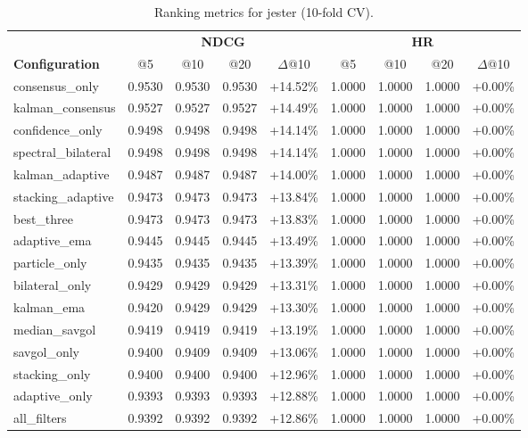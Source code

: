 \begin{table}[htbp]
\centering
\caption{Ranking metrics for jester (10-fold CV).}
\label{tab:ranking-jester}
\begin{adjustbox}{max width=\textwidth}
\begin{tabular}{l cccc cccc}
\toprule
& \multicolumn{4}{c}{\textbf{NDCG}} & \multicolumn{4}{c}{\textbf{HR}} \\
\cmidrule(lr){2-5} \cmidrule(lr){6-9}
\textbf{Configuration} & @5 & @10 & @20 & $\Delta$@10 & @5 & @10 & @20 & $\Delta$@10 \\
\midrule
consensus\_only & 0.9530 & 0.9530 & 0.9530 & +14.52\% & 1.0000 & 1.0000 & 1.0000 & +0.00\% \\
kalman\_consensus & 0.9527 & 0.9527 & 0.9527 & +14.49\% & 1.0000 & 1.0000 & 1.0000 & +0.00\% \\
confidence\_only & 0.9498 & 0.9498 & 0.9498 & +14.14\% & 1.0000 & 1.0000 & 1.0000 & +0.00\% \\
spectral\_bilateral & 0.9498 & 0.9498 & 0.9498 & +14.14\% & 1.0000 & 1.0000 & 1.0000 & +0.00\% \\
kalman\_adaptive & 0.9487 & 0.9487 & 0.9487 & +14.00\% & 1.0000 & 1.0000 & 1.0000 & +0.00\% \\
stacking\_adaptive & 0.9473 & 0.9473 & 0.9473 & +13.84\% & 1.0000 & 1.0000 & 1.0000 & +0.00\% \\
best\_three & 0.9473 & 0.9473 & 0.9473 & +13.83\% & 1.0000 & 1.0000 & 1.0000 & +0.00\% \\
adaptive\_ema & 0.9445 & 0.9445 & 0.9445 & +13.49\% & 1.0000 & 1.0000 & 1.0000 & +0.00\% \\
particle\_only & 0.9435 & 0.9435 & 0.9435 & +13.39\% & 1.0000 & 1.0000 & 1.0000 & +0.00\% \\
bilateral\_only & 0.9429 & 0.9429 & 0.9429 & +13.31\% & 1.0000 & 1.0000 & 1.0000 & +0.00\% \\
kalman\_ema & 0.9420 & 0.9429 & 0.9429 & +13.30\% & 1.0000 & 1.0000 & 1.0000 & +0.00\% \\
median\_savgol & 0.9419 & 0.9419 & 0.9419 & +13.19\% & 1.0000 & 1.0000 & 1.0000 & +0.00\% \\
savgol\_only & 0.9400 & 0.9409 & 0.9409 & +13.06\% & 1.0000 & 1.0000 & 1.0000 & +0.00\% \\
stacking\_only & 0.9400 & 0.9400 & 0.9400 & +12.96\% & 1.0000 & 1.0000 & 1.0000 & +0.00\% \\
adaptive\_only & 0.9393 & 0.9393 & 0.9393 & +12.88\% & 1.0000 & 1.0000 & 1.0000 & +0.00\% \\
all\_filters & 0.9392 & 0.9392 & 0.9392 & +12.86\% & 1.0000 & 1.0000 & 1.0000 & +0.00\% \\

\end{tabular}
\end{adjustbox}
\end{table}
